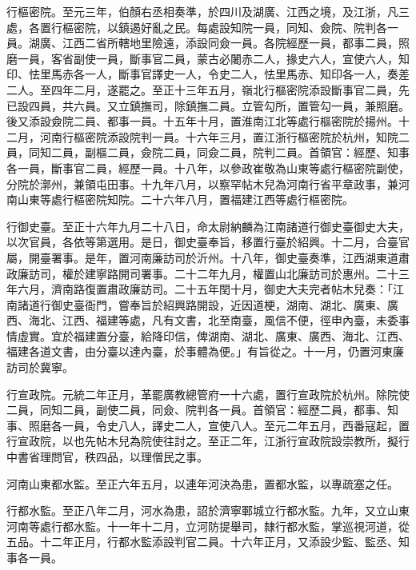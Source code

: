 \begin{pinyinscope}
 行樞密院。至元三年，伯顏右丞相奏準，於四川及湖廣、江西之境，及江浙，凡三處，各置行樞密院，以鎮遏好亂之民。每處設知院一員，同知、僉院、院判各一員。湖廣、江西二省所轄地里險遠，添設同僉一員。各院經歷一員，都事二員，照磨一員，客省副使一員，斷事官二員，蒙古必闍赤二人，掾史六人，宣使六人，知印、怯里馬赤各一人，斷事官譯史一人，令史二人，怯里馬赤、知印各一人，奏差二人。至四年二月，遂罷之。至正十三年五月，嶺北行樞密院添設斷事官二員，先已設四員，共六員。又立鎮撫司，除鎮撫二員。立管勾所，置管勾一員，兼照磨。後又添設僉院二員、都事一員。十五年十月，置淮南江北等處行樞密院於揚州。十二月，河南行樞密院添設院判一員。十六年三月，置江浙行樞密院於杭州，知院二員，同知二員，副樞二員，僉院二員，同僉二員，院判二員。首領官：經歷、知事各一員，斷事官二員，經歷一員。十八年，以參政崔敬為山東等處行樞密院副使，分院於漷州，兼領屯田事。十九年八月，以察罕帖木兒為河南行省平章政事，兼河南山東等處行樞密院知院。二十六年八月，置福建江西等處行樞密院。



 行御史臺。至正十六年九月二十八日，命太尉納麟為江南諸道行御史臺御史大夫，以次官員，各依等第選用。是日，御史臺奉旨，移置行臺於紹興。十二月，合臺官屬，開臺署事。是年，置河南廉訪司於沂州。十八年，御史臺奏準，江西湖東道肅政廉訪司，權於建寧路開司署事。二十二年九月，權置山北廉訪司於惠州。二十三年六月，濟南路復置肅政廉訪司。二十五年閏十月，御史大夫完者帖木兒奏：「江南諸道行御史臺衙門，嘗奉旨於紹興路開設，近因道梗，湖南、湖北、廣東、廣西、海北、江西、福建等處，凡有文書，北至南臺，風信不便，徑申內臺，未委事情虛實。宜於福建置分臺，給降印信，俾湖南、湖北、廣東、廣西、海北、江西、福建各道文書，由分臺以達內臺，於事體為便。」有旨從之。十一月，仍置河東廉訪司於冀寧。



 行宣政院。元統二年正月，革罷廣教總管府一十六處，置行宣政院於杭州。除院使二員，同知二員，副使二員，同僉、院判各一員。首領官：經歷二員，都事、知事、照磨各一員，令史八人，譯史二人，宣使八人。至元二年五月，西番寇起，置行宣政院，以也先帖木兒為院使往討之。至正二年，江浙行宣政院設崇教所，擬行中書省理問官，秩四品，以理僧民之事。



 河南山東都水監。至正六年五月，以連年河決為患，置都水監，以專疏塞之任。



 行都水監。至正八年二月，河水為患，詔於濟寧鄆城立行都水監。九年，又立山東河南等處行都水監。十一年十二月，立河防提舉司，隸行都水監，掌巡視河道，從五品。十二年正月，行都水監添設判官二員。十六年正月，又添設少監、監丞、知事各一員。




\end{pinyinscope}
